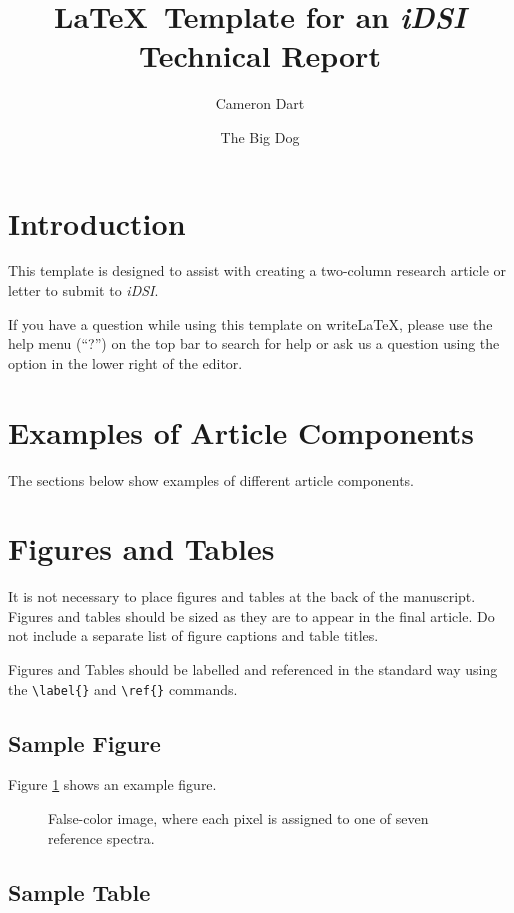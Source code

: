 \documentclass[9pt,twocolumn,twoside]{idsi}
\author[1]{Cameron Dart}
\author[2]{The Big Dog}
\affil[1]{National Center For Supercomputing Applications (NCSA)}
\affil[2]{Laboratory for Computation, Data, and Machine Learning}
\affil[3]{Illinois Data Science Initiative}
\title{\LaTeX\ Template for an \emph{iDSI} Technical Report}
\begin{document}
\maketitle

\section{Introduction}
This template is designed to assist with creating a two-column research article or letter to submit to \emph{iDSI}.

If you have a question while using this template on write\LaTeX{}, please use the help menu (``?'') on the top bar to search for help or ask us a question using the option in the lower right of the editor.

\section{Examples of Article Components}
\label{sec:examples}

The sections below show examples of different article components.

\section{Figures and Tables}

It is not necessary to place figures and tables at the back of the manuscript. Figures and tables should be sized as they are to appear in the final article. Do not include a separate list of figure captions and table titles.

Figures and Tables should be labelled and referenced in the standard way using the \verb|\label{}| and \verb|\ref{}| commands.

\subsection{Sample Figure}

Figure \ref{fig:false-color} shows an example figure.

\begin{figure}[htbp]
\centering
\caption{False-color image, where each pixel is assigned to one of seven reference spectra.}
\label{fig:false-color}
\end{figure}

\subsection{Sample Table}
\end{document}
